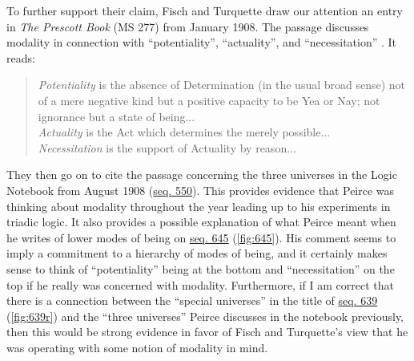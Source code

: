 To further support their claim, Fisch and Turquette draw our attention an entry in \textit{The Prescott Book} (MS 277) from January 1908. The passage discusses modality in connection with ``potentiality'', ``actuality'', and ``necessitation'' \citep{fisch_peirces_1966}. It reads: \begin{quotation}
\noindent\textit{Potentiality} is the absence of Determination (in the usual broad sense) not of a mere negative kind but a positive capacity to be Yea or Nay; not ignorance but a state of being...\\ \textit{Actuality} is the Act which determines the merely possible...\\ \textit{Necessitation} is the support of Actuality by reason...
\end{quotation}
\noindent They then go on to cite the passage concerning the three universes in the Logic Notebook from August 1908 (\href{https://iiif.lib.harvard.edu/manifests/view/drs:15255301$550i}{seq. 550}). This provides evidence that Peirce was thinking about modality throughout the year leading up to his experiments in triadic logic. It also provides a possible explanation of what Peirce meant when he writes of lower modes of being on \href{https://iiif.lib.harvard.edu/manifests/view/drs:15255301$645i}{seq. 645} (\ref{fig:645}). His comment seems to imply a commitment to a hierarchy of modes of being, and it certainly makes sense to think of ``potentiality'' being at the bottom and ``necessitation'' on the top if he really was concerned with modality. Furthermore, if I am correct that there is a connection between the ``special universes'' in the title of \href{https://iiif.lib.harvard.edu/manifests/view/drs:15255301$639i}{seq. 639} (\ref{fig:639r}) and the ``three universes'' Peirce discusses in the notebook previously, then this would be strong evidence in favor of Fisch and Turquette's view that he was operating with some notion of modality in mind.

